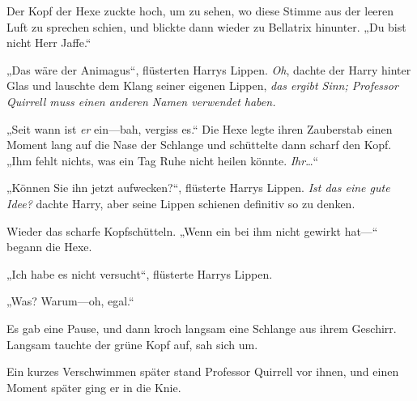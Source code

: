Der Kopf der Hexe zuckte hoch, um zu sehen, wo diese Stimme aus der leeren Luft zu sprechen schien, und blickte dann wieder zu Bellatrix hinunter.
„Du bist nicht Herr Jaffe.“

„Das wäre der Animagus“, flüsterten Harrys Lippen. \emph{Oh}, dachte der Harry hinter Glas und lauschte dem Klang seiner eigenen Lippen, \emph{das ergibt Sinn; Professor Quirrell muss einen anderen Namen verwendet haben.}

„Seit wann ist \emph{er} ein—bah, vergiss es.“ Die Hexe legte ihren Zauberstab einen Moment lang auf die Nase der Schlange und schüttelte dann scharf den Kopf.
„Ihm fehlt nichts, was ein Tag Ruhe nicht heilen könnte. \emph{Ihr}…“

„Können Sie ihn jetzt aufwecken?“, flüsterte Harrys Lippen. \emph{Ist das eine gute Idee?} dachte Harry, aber seine Lippen schienen definitiv so zu denken.

Wieder das scharfe Kopfschütteln.
„Wenn ein  bei ihm nicht gewirkt hat—“ begann die Hexe.

„Ich habe es nicht versucht“, flüsterte Harrys Lippen.

„Was? Warum—oh, egal.“ 

Es gab eine Pause, und dann kroch langsam eine Schlange aus ihrem Geschirr. Langsam tauchte der grüne Kopf auf, sah sich um.

Ein kurzes Verschwimmen später stand Professor Quirrell vor ihnen, und einen Moment später ging er in die Knie.


